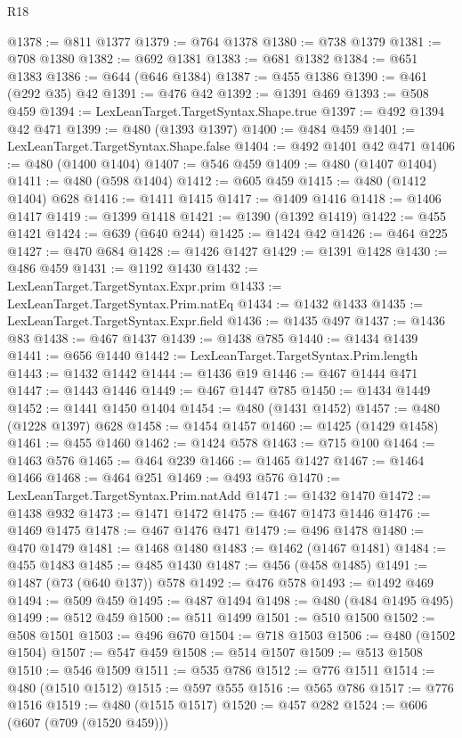 \begin{lexlean}{R18}
\begin{coremodule}
@1378 := @811 @1377
@1379 := @764 @1378
@1380 := @738 @1379
@1381 := @708 @1380
@1382 := @692 @1381
@1383 := @681 @1382
@1384 := @651 @1383
@1386 := @644 (@646 @1384)
@1387 := @455 @1386
@1390 := @461 (@292 @35) @42
@1391 := @476 @42
@1392 := @1391 @469
@1393 := @508 @459
@1394 := LexLeanTarget.TargetSyntax.Shape.true
@1397 := @492 @1394 @42 @471
@1399 := @480 (@1393 @1397)
@1400 := @484 @459
@1401 := LexLeanTarget.TargetSyntax.Shape.false
@1404 := @492 @1401 @42 @471
@1406 := @480 (@1400 @1404)
@1407 := @546 @459
@1409 := @480 (@1407 @1404)
@1411 := @480 (@598 @1404)
@1412 := @605 @459
@1415 := @480 (@1412 @1404) @628
@1416 := @1411 @1415
@1417 := @1409 @1416
@1418 := @1406 @1417
@1419 := @1399 @1418
@1421 := @1390 (@1392 @1419)
@1422 := @455 @1421
@1424 := @639 (@640 @244)
@1425 := @1424 @42
@1426 := @464 @225
@1427 := @470 @684
@1428 := @1426 @1427
@1429 := @1391 @1428
@1430 := @486 @459
@1431 := @1192 @1430
@1432 := LexLeanTarget.TargetSyntax.Expr.prim
@1433 := LexLeanTarget.TargetSyntax.Prim.natEq
@1434 := @1432 @1433
@1435 := LexLeanTarget.TargetSyntax.Expr.field
@1436 := @1435 @497
@1437 := @1436 @83
@1438 := @467 @1437
@1439 := @1438 @785
@1440 := @1434 @1439
@1441 := @656 @1440
@1442 := LexLeanTarget.TargetSyntax.Prim.length
@1443 := @1432 @1442
@1444 := @1436 @19
@1446 := @467 @1444 @471
@1447 := @1443 @1446
@1449 := @467 @1447 @785
@1450 := @1434 @1449
@1452 := @1441 @1450 @1404
@1454 := @480 (@1431 @1452)
@1457 := @480 (@1228 @1397) @628
@1458 := @1454 @1457
@1460 := @1425 (@1429 @1458)
@1461 := @455 @1460
@1462 := @1424 @578
@1463 := @715 @100
@1464 := @1463 @576
@1465 := @464 @239
@1466 := @1465 @1427
@1467 := @1464 @1466
@1468 := @464 @251
@1469 := @493 @576
@1470 := LexLeanTarget.TargetSyntax.Prim.natAdd
@1471 := @1432 @1470
@1472 := @1438 @932
@1473 := @1471 @1472
@1475 := @467 @1473 @1446
@1476 := @1469 @1475
@1478 := @467 @1476 @471
@1479 := @496 @1478
@1480 := @470 @1479
@1481 := @1468 @1480
@1483 := @1462 (@1467 @1481)
@1484 := @455 @1483
@1485 := @485 @1430
@1487 := @456 (@458 @1485)
@1491 := @1487 (@73 (@640 @137)) @578
@1492 := @476 @578
@1493 := @1492 @469
@1494 := @509 @459
@1495 := @487 @1494
@1498 := @480 (@484 @1495 @495)
@1499 := @512 @459
@1500 := @511 @1499
@1501 := @510 @1500
@1502 := @508 @1501
@1503 := @496 @670
@1504 := @718 @1503
@1506 := @480 (@1502 @1504)
@1507 := @547 @459
@1508 := @514 @1507
@1509 := @513 @1508
@1510 := @546 @1509
@1511 := @535 @786
@1512 := @776 @1511
@1514 := @480 (@1510 @1512)
@1515 := @597 @555
@1516 := @565 @786
@1517 := @776 @1516
@1519 := @480 (@1515 @1517)
@1520 := @457 @282
@1524 := @606 (@607 (@709 (@1520 @459)))

\end{coremodule}
\end{lexlean}
